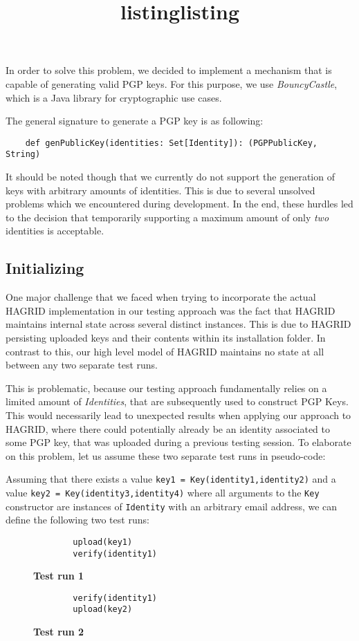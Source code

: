 In order to solve this problem, we decided to implement a mechanism that is capable of generating valid PGP keys. 
For this purpose, we use \emph{BouncyCastle}, which is a Java library for cryptographic use cases.

The general signature to generate a PGP key is as following: 
\begin{verbatim}
    def genPublicKey(identities: Set[Identity]): (PGPPublicKey, String)
\end{verbatim}
It should be noted though that we currently do not support the generation of keys with arbitrary amounts of identities. This is due to several unsolved problems which we encountered during development. In the end, these hurdles led to the decision that temporarily supporting a maximum amount of only \emph{two} identities is acceptable.
\newpage
\subsection{Initializing}
One major challenge that we faced when trying to incorporate the actual HAGRID implementation in our testing approach was the fact that HAGRID maintains internal state across several distinct instances. This is due to HAGRID persisting uploaded keys and their contents within its installation folder. 
In contrast to this, our high level model of HAGRID maintains no state at all between any two separate test runs.

This is problematic, because our testing approach fundamentally relies on a limited amount of \emph{Identities}, that are subsequently used to construct PGP Keys. This would necessarily lead to unexpected results when applying our approach to HAGRID, where there could potentially already be an identity associated to some PGP key, that was uploaded during a previous testing session. 
To elaborate on this problem, let us assume these two separate test runs in pseudo-code:

Assuming that there exists a value \texttt{key1 = Key(identity1,identity2)} and a value \texttt{key2 = Key(identity3,identity4)}
 where all arguments to the \texttt{Key} constructor are instances of \texttt{Identity} with an arbitrary email address, we can define the following two test runs: 
\begin{figure}[!h]
    \begin{minipage}{0.5\textwidth}
        \centering
        \begin{verbatim}
        upload(key1)
        verify(identity1)
        \end{verbatim}
        \title{listing}{\textbf{Test run 1}}
    \end{minipage}
    \begin{minipage}{0.5\textwidth}
        \centering
        \begin{verbatim}
        verify(identity1)
        upload(key2)
        \end{verbatim}
        \title{listing}{\textbf{Test run 2}}
    \end{minipage}
\end{figure}

